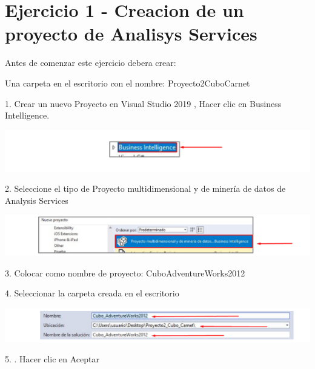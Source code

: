 \section{Ejercicio 1 - Creacion de un proyecto de Analisys Services}  

Antes de comenzar este ejercicio debera crear:

Una carpeta en el escritorio con el nombre: Proyecto2CuboCarnet

1. Crear un nuevo Proyecto en Visual Studio 2019 , Hacer clic en Business Intelligence.

	\begin{center}
	\includegraphics[width=\columnwidth]{images/task1/img1}
	\end{center}	


2. Seleccione el tipo de Proyecto multidimensional y de minería de datos de Analysis Services
	\begin{center}
	\includegraphics[width=\columnwidth]{images/task1/img2}
	\end{center}	

3. Colocar como nombre de proyecto: CuboAdventureWorks2012
		
4. Seleccionar la carpeta creada en el escritorio

	\begin{center}
	\includegraphics[width=\columnwidth]{images/task1/img4}
    \end{center}	

5. . Hacer clic en Aceptar

    